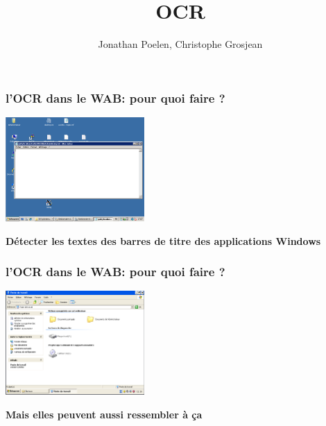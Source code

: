 \documentclass[xcolor=dvipsnames]{beamer}
\author{Jonathan Poelen, Christophe Grosjean}
\institute{Wallix}
\title{OCR}
\begin{document}
\begin{frame}[plain]
\titlepage
\end{frame}





\begin{frame}
\frametitle{l'OCR dans le WAB: pour quoi faire ?}
    \begin{center}
       \includegraphics[width=200px]{TBar2.png}
      \begin{alertblock}{}
            \begin{center}
                  \textbf{\Large Détecter les textes des barres de titre des applications Windows}
            \end{center}
      \end{alertblock}
    \end{center}
\end{frame}

\begin{frame}
\frametitle{l'OCR dans le WAB: pour quoi faire ?}
    \begin{center}
       \includegraphics[width=200px]{PosteDeTravail.png}
      \begin{alertblock}{}
            \begin{center}
                  \textbf{\Large Mais elles peuvent aussi ressembler à ça}
            \end{center}
      \end{alertblock}
    \end{center}
\end{frame}
\end{document}
